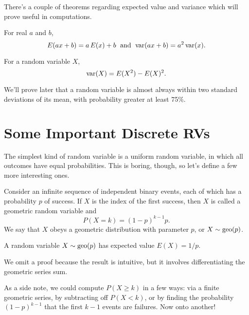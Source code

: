 \documentclass[../m157main.tex]{subfiles}
\begin{document}
There's a couple of theorems regarding expected value and variance which will prove useful in computations.

\begin{theorem}
    For real $a$ and $b$, \vspace{-4pt}
    \[ E(ax + b) = a \,E(x) + b \;\text{ and }\; \textrm{var}(ax + b) = a^2 \,\textrm{var}(x). \]
\end{theorem}

\begin{theorem}
    For a random variable $X$, \vspace{-4pt}
    \[ \textrm{var}(X) = E(X^2) - E(X)^2. \]
\end{theorem}

We'll prove later that a random variable is almost always within two standard deviations of its mean, with probability greater at least 75\%.

\section{Some Important Discrete RVs}
The simplest kind of random variable is a uniform random variable, in which all outcomes have equal probabilities.
This is boring, though, so let's define a few more interesting ones.

\begin{definition}
    Consider an infinite sequence of independent binary events, each of which has a probability $p$ of success.
    If $X$ is the index of the first success, then $X$ is called a geometric random variable and
    \[ P(X = k) = (1-p)^{k-1} p. \]
    We say that $X$ obeys a geometric distribution with parameter $p$, or $X \sim \textrm{geo}(p)$.
\end{definition}

\begin{theorem}
    A random variable $X \sim \textrm{geo}(p)$ has expected value $E(X) = 1 / p$.
\end{theorem}

We omit a proof because the result is intuitive, but it involves differentiating the geometric series sum.

As a side note, we could compute $P(X \geq k)$ in a few ways: via a finite geometric series, by subtracting off $P(X < k)$, or by finding the probability $(1 - p)^{k-1}$ that the first $k-1$ events are failures.
Now onto another!
\end{document}

